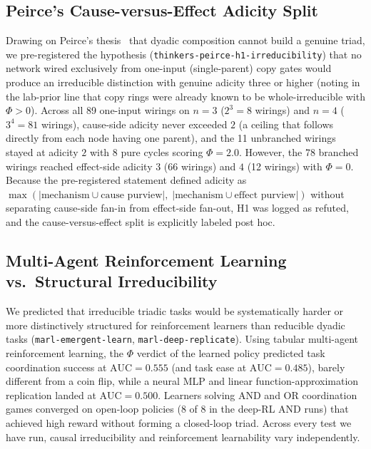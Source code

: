 \documentclass[11pt,a4paper]{article}
\begin{document}
\subsection{Peirce's Cause-versus-Effect Adicity Split}

Drawing on Peirce's thesis~\cite{peirce1870description} that dyadic composition cannot build a genuine triad, we pre-registered the hypothesis (\texttt{thinkers-peirce-h1-irreducibility}) that no network wired exclusively from one-input (single-parent) copy gates would produce an irreducible distinction with genuine adicity three or higher (noting in the lab-prior line that copy rings were already known to be whole-irreducible with $\Phi > 0$). Across all 89 one-input wirings on $n = 3$ ($2^3 = 8$ wirings) and $n = 4$ ($3^4 = 81$ wirings), cause-side adicity never exceeded $2$ (a ceiling that follows directly from each node having one parent), and the 11 unbranched wirings stayed at adicity $2$ with 8 pure cycles scoring $\Phi = 2.0$. However, the 78 branched wirings reached effect-side adicity $3$ (66 wirings) and $4$ (12 wirings) with $\Phi = 0$. Because the pre-registered statement defined adicity as $\max(|\text{mechanism} \cup \text{cause purview}|,\; |\text{mechanism} \cup \text{effect purview}|)$ without separating cause-side fan-in from effect-side fan-out, H1 was logged as refuted, and the cause-versus-effect split is explicitly labeled post hoc.

\subsection{Multi-Agent Reinforcement Learning vs.\ Structural Irreducibility}

We predicted that irreducible triadic tasks would be systematically harder or more distinctively structured for reinforcement learners than reducible dyadic tasks (\texttt{marl-emergent-learn}, \texttt{marl-deep-replicate}). Using tabular multi-agent reinforcement learning, the $\Phi$ verdict of the learned policy predicted task coordination success at $\mathrm{AUC} = 0.555$ (and task ease at $\mathrm{AUC} = 0.485$), barely different from a coin flip, while a neural MLP and linear function-approximation replication landed at $\mathrm{AUC} = 0.500$. Learners solving $\mathrm{AND}$ and $\mathrm{OR}$ coordination games converged on open-loop policies ($8$ of $8$ in the deep-RL $\mathrm{AND}$ runs) that achieved high reward without forming a closed-loop triad. Across every test we have run, causal irreducibility and reinforcement learnability vary independently.
\end{document}
